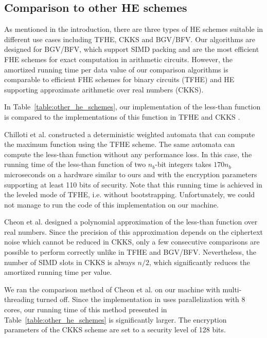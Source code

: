 \subsection{Comparison to other HE schemes}
    As mentioned in the introduction, there are three types of HE schemes suitable in different use cases including TFHE, CKKS and BGV/BFV.
    Our algorithms are designed for BGV/BFV, which support SIMD packing and are the most efficient FHE schemes for exact computation in arithmetic circuits.
    However, the amortized running time per data value of our comparison algorithms is comparable to efficient FHE schemes for binary circuits (TFHE) and HE supporting approximate arithmetic over real numbers (CKKS). 

    In Table~\ref{table:other_he_schemes}, our implementation of the less-than function is compared to the implementations of this function in TFHE \cite{AC:CGGI17} and CKKS \cite{EPRINT:CheKimKim19}.

    Chilloti et al. \cite{AC:CGGI17} constructed a deterministic weighted automata that can compute the maximum function using the TFHE scheme.
    The same automata can compute the less-than function without any performance loss. 
    In this case, the running time of the less-than function of two $n_b$-bit integers takes $170 n_b$ microseconds on a hardware similar to ours and with the encryption parameters supporting at least 110 bits of security.
    Note that this running time is achieved in the leveled mode of TFHE, i.e. without bootstrapping.
    Unfortunately, we could not manage to run the code of this implementation on our machine.

    Cheon et al. \cite{EPRINT:CheKimKim19} designed a polynomial approximation of the less-than function over real numbers.
    Since the precision of this approximation depends on the ciphertext noise which cannot be reduced in CKKS, only a few consecutive comparisons are possible to perform correctly unlike in TFHE and BGV/BFV.
    Nevertheless, the number of SIMD slots in CKKS is always $n/2$, which significantly reduces the amortized running time per value.

    We ran the comparison method of Cheon et al. on our machine with multi-threading turned off. 
    Since the implementation in \cite{EPRINT:CheKimKim19} uses parallelization with 8 cores, our running time of this method presented in Table~\ref{table:other_he_schemes} is significantly larger.
    The encryption parameters of the CKKS scheme are set to a security level of 128 bits.

